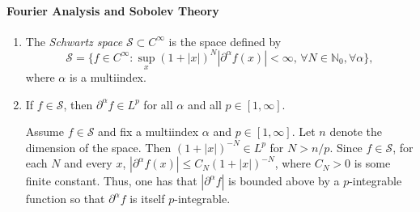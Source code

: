\documentclass{article}
\begin{document}
	
	\paragraph{Fourier Analysis and Sobolev Theory} 
	\begin{enumerate}[resume=real_analysis]
		\item The \textit{Schwartz space} $\mathscr{S} \subset C^{\infty}$ is the space defined by 
		\begin{equation*}
			\mathscr{S} = \{f \in C^{\infty}: \sup_{x}(1 + |x|)^{N}|\partial^{\alpha}f(x)| < \infty, \hspace{2pt} \forall N \in \mathbb{N}_{0}, \forall \alpha\}, 
		\end{equation*}
		where $\alpha$ is a multiindex. 
		\item If $f \in \mathscr{S}$, then $\partial^{\alpha}f \in L^{p}$ for all $\alpha$ and all $p \in [1, \infty]$.  \newline 
		\begin{solutions}
			Assume $f \in \mathscr{S}$ and fix a multiindex $\alpha$ and $p \in [1,\infty]$. Let $n$ denote the dimension of the space. Then $(1 + |x|)^{-N} \in L^{p}$ for $N > n/p$. Since $f \in \mathscr{S}$, for each $N$ and every $x$, $|\partial^{\alpha}f(x)| \leq C_{N}(1 + |x|)^{-N}$, where $C_{N} > 0$ is some finite constant.  Thus, one has that $|\partial^{\alpha}f|$ is bounded above by a $p$-integrable function so that $\partial^{\alpha}f$ is itself $p$-integrable. 
		\end{solutions} 
		

\end{enumerate}
\end{document}
